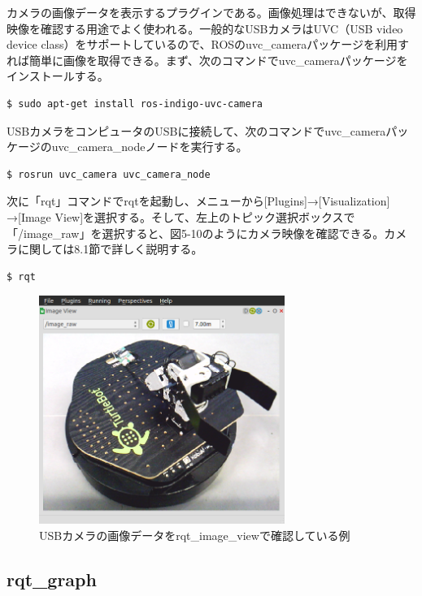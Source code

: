 カメラの画像データを表示するプラグインである。画像処理はできないが、取得映像を確認する用途でよく使われる。一般的なUSBカメラはUVC（USB video device class）をサポートしているので、ROSのuvc\_cameraパッケージを利用すれば簡単に画像を取得できる。まず、次のコマンドでuvc\_cameraパッケージをインストールする。

\begin{lstlisting}[language=ROS]
$ sudo apt-get install ros-indigo-uvc-camera
\end{lstlisting}

USBカメラをコンピュータのUSBに接続して、次のコマンドでuvc\_cameraパッケージのuvc\_camera\_nodeノードを実行する。

\begin{lstlisting}[language=ROS]
$ rosrun uvc_camera uvc_camera_node
\end{lstlisting}

次に「rqt」コマンドでrqtを起動し、メニューから[Plugins]→[Visualization] →[Image View]を選択する。そして、左上のトピック選択ボックスで「/image\_raw」を選択すると、図5-10のようにカメラ映像を確認できる。カメラに関しては8.1節で詳しく説明する。

\begin{lstlisting}[language=ROS]
$ rqt
\end{lstlisting}

\begin{figure}[h]
  \centering
  \includegraphics[width=8cm]{pictures/chapter5/pic_05_10.png}
  \caption{USBカメラの画像データをrqt\_image\_viewで確認している例}
\end{figure}


\subsection{rqt\_graph}

